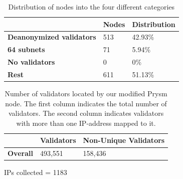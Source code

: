 \begin{table}[]
    \centering
    \caption{Distribution of nodes into the four different categories}
    \begin{tabular}{lll}
        \hline
        & \textbf{Nodes} & \textbf{Distribution} \\ \hline
        \textbf{Deanonymized validators} & 513            & 42.93\%                 \\
        \textbf{64 subnets}              & 71             & 5.94\%                  \\
        \textbf{No validators}           & 0              & 0\%                     \\
        \textbf{Rest}                    & 611            & 51.13\%                 \\ \hline
    \end{tabular}
    \label{tab:distribution}
\end{table}


\begin{table}[]
    \centering
    \caption{Number of validators located by our modified Prysm node. The first column indicates the total number of validators. The second column indicates validators with more than one IP-address mapped to it.}
    \begin{tabular}{lll}
        \hline
        & \textbf{Validators} & \textbf{Non-Unique Validators} \\ \hline
        \textbf{Overall} & 493,551             & 158,436                        \\ \hline
    \end{tabular}
    \label{tab:unique vals}
\end{table}

IPs collected = 1183

